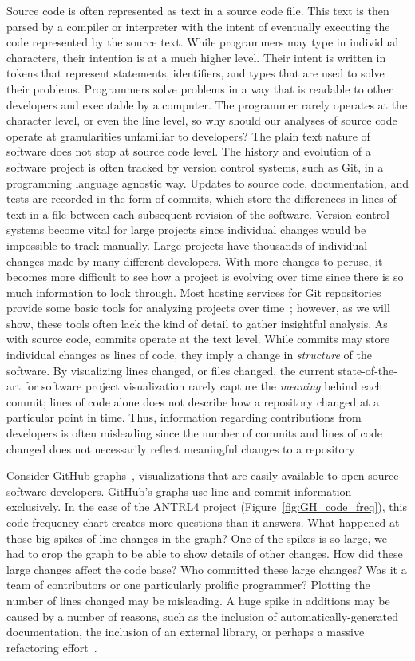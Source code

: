 Source code is often represented as text in a source code file. This text is then parsed by a compiler or interpreter with the intent of eventually executing the code represented by the source text. While programmers may type in individual characters, their intention is at a much higher level. Their intent is written in tokens that represent statements, identifiers, and types that are used to solve their problems. Programmers solve problems in a way that is readable to other developers and executable by a computer. The programmer rarely operates at the character level, or even the line level, so why should our analyses of source code operate at granularities unfamiliar to developers?
The plain text nature of software does not stop at source code level. The history and evolution of a software project is often tracked by version control systems, such as Git, in a programming language agnostic way. Updates to source code, documentation, and tests are recorded in the form of commits, which store the differences in lines of text in a file between each subsequent revision of the software. Version control systems become vital for large projects since individual changes would be impossible to track manually. Large projects have thousands of individual changes made by many different developers. With more changes to peruse, it becomes more difficult to see how a project is evolving over time since there is so much information to look through. Most hosting services for Git repositories provide some basic tools for analyzing projects over time~\cite{github-graphs,bitbucket-graphs}; however, as we will show, these tools often lack the kind of detail to gather insightful analysis. As with source code, commits operate at the text level. While commits may store individual changes as lines of code, they imply a change in \emph{structure} of the software.  By visualizing lines changed, or files changed, the current state-of-the-art for software project visualization rarely capture the \emph{meaning} behind each commit; lines of code alone does not describe how a repository changed at a particular point in time. Thus, information regarding contributions from developers is often misleading since the number of commits and lines of code changed does not necessarily reflect meaningful changes to a repository~\cite{robles2014}.

Consider GitHub graphs~\cite{github-graphs}, visualizations that are easily available to open source software developers. GitHub's graphs use line and commit information exclusively. In the case of the ANTRL4 project (Figure~\ref{fig:GH_code_freq}), this code frequency chart creates more questions than it answers. What happened at those big spikes of line changes in the graph? One of the spikes is so large, we had to crop the graph to be able to show details of other changes. How did these large changes affect the code base? Who committed these large changes? Was it a team of contributors or one particularly prolific programmer? Plotting the number of lines changed may be misleading. A huge spike in additions may be caused by a number of reasons, such as the inclusion of automatically-generated documentation, the inclusion of an external library, or perhaps a massive refactoring effort~\cite{Hindle:2008:LCT:1370750.1370773}.

